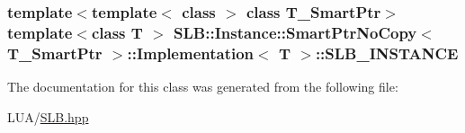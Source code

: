 \subsubsection[{\texorpdfstring{S\+L\+B\+\_\+\+I\+N\+S\+T\+A\+N\+CE}{SLB_INSTANCE}}]{\setlength{\rightskip}{0pt plus 5cm}template$<$template$<$ class $>$ class T\+\_\+\+Smart\+Ptr$>$ template$<$class T $>$ {\bf S\+L\+B\+::\+Instance\+::\+Smart\+Ptr\+No\+Copy}$<$ T\+\_\+\+Smart\+Ptr $>$\+::{\bf Implementation}$<$ T $>$\+::S\+L\+B\+\_\+\+I\+N\+S\+T\+A\+N\+CE\hspace{0.3cm}{\ttfamily [protected]}}\hypertarget{classSLB_1_1Instance_1_1SmartPtrNoCopy_1_1Implementation_ad9f97e84263934f1339861a12c36a23e}{}\label{classSLB_1_1Instance_1_1SmartPtrNoCopy_1_1Implementation_ad9f97e84263934f1339861a12c36a23e}


The documentation for this class was generated from the following file\+:\begin{DoxyCompactItemize}
\item 
L\+U\+A/\hyperlink{SLB_8hpp}{S\+L\+B.\+hpp}\end{DoxyCompactItemize}
